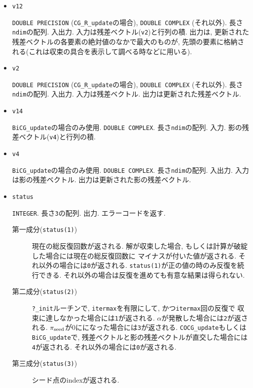 \documentclass[12pt,titlepage]{article}
\begin{document}
\begin{itemize}

\item \verb|v12|

  \verb|DOUBLE PRECISION| (\verb|CG_R_update|の場合),
  \verb|DOUBLE COMPLEX| (それ以外).
  長さ\verb|ndim|の配列. 入出力.
  入力は残差ベクトル(\verb|v2|)と行列の積.
  出力は, 更新された残差ベクトルの各要素の絶対値のなかで最大のものが,
  先頭の要素に格納される(これは収束の具合を表示して調べる時などに用いる).

\item \verb|v2|

  \verb|DOUBLE PRECISION| (\verb|CG_R_update|の場合),
  \verb|DOUBLE COMPLEX| (それ以外).
  長さ\verb|ndim|の配列. 入出力.
  入力は残差ベクトル.
  出力は更新された残差ベクトル.

\item \verb|v14|
  
  \verb|BiCG_update|の場合のみ使用. \verb|DOUBLE COMPLEX|.
  長さ\verb|ndim|の配列. 入力.
  影の残差ベクトル(\verb|v4|)と行列の積.
  
\item \verb|v4|
  
  \verb|BiCG_update|の場合のみ使用. \verb|DOUBLE COMPLEX|.
  長さ\verb|ndim|の配列. 入出力.
  入力は影の残差ベクトル.
  出力は更新された影の残差ベクトル.

\item \verb|status|

  \verb|INTEGER|. 長さ\verb|3|の配列. 出力. エラーコードを返す.
  \begin{description}
  \item [第一成分(\texttt{status(1)})]
    現在の総反復回数が返される.
    解が収束した場合, もしくは計算が破綻した場合には現在の総反復回数に
    マイナスが付いた値が返される.
    それ以外の場合には\verb|0|が返される.
    \verb|status(1)|が正の値の時のみ反復を続行できる.
    それ以外の場合は反復を進めても有意な結果は得られない.
    
  \item [第二成分(\texttt{status(2)})]
    \verb|?_init|ルーチンで, \verb|itermax|を有限にして, かつ\verb|itermax|回の反復で
    収束に達しなかった場合には\verb|1|が返される.
    $\alpha$が発散した場合には\verb|2|が返される.
    $\pi_{\rm seed}$が0にになった場合には\verb|3|が返される.
    \verb|COCG_update|もしくは\verb|BiCG_update|で,
    残差ベクトルと影の残差ベクトルが直交した場合には\verb|4|が返される.
    それ以外の場合には\verb|0|が返される.

  \item [第三成分(\texttt{status(3)})]
    シード点のindexが返される.
  \end{description}

\end{itemize}
\end{document}

